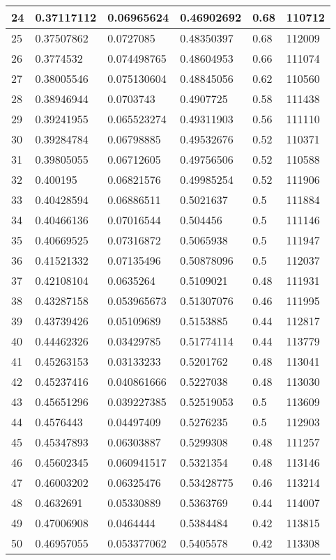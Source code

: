 \begin{longtable}{|l|l|l|l|l|l|}
24 & 0.37117112 & 0.06965624 & 0.46902692 & 0.68 & 110712 \\ \hline 
25 & 0.37507862 & 0.0727085 & 0.48350397 & 0.68 & 112009 \\ \hline 
26 & 0.3774532 & 0.074498765 & 0.48604953 & 0.66 & 111074 \\ \hline 
27 & 0.38005546 & 0.075130604 & 0.48845056 & 0.62 & 110560 \\ \hline 
28 & 0.38946944 & 0.0703743 & 0.4907725 & 0.58 & 111438 \\ \hline 
29 & 0.39241955 & 0.065523274 & 0.49311903 & 0.56 & 111110 \\ \hline 
30 & 0.39284784 & 0.06798885 & 0.49532676 & 0.52 & 110371 \\ \hline 
31 & 0.39805055 & 0.06712605 & 0.49756506 & 0.52 & 110588 \\ \hline 
32 & 0.400195 & 0.06821576 & 0.49985254 & 0.52 & 111906 \\ \hline 
33 & 0.40428594 & 0.06886511 & 0.5021637 & 0.5 & 111884 \\ \hline 
34 & 0.40466136 & 0.07016544 & 0.504456 & 0.5 & 111146 \\ \hline 
35 & 0.40669525 & 0.07316872 & 0.5065938 & 0.5 & 111947 \\ \hline 
36 & 0.41521332 & 0.07135496 & 0.50878096 & 0.5 & 112037 \\ \hline 
37 & 0.42108104 & 0.0635264 & 0.5109021 & 0.48 & 111931 \\ \hline 
38 & 0.43287158 & 0.053965673 & 0.51307076 & 0.46 & 111995 \\ \hline 
39 & 0.43739426 & 0.05109689 & 0.5153885 & 0.44 & 112817 \\ \hline 
40 & 0.44462326 & 0.03429785 & 0.51774114 & 0.44 & 113779 \\ \hline 
41 & 0.45263153 & 0.03133233 & 0.5201762 & 0.48 & 113041 \\ \hline 
42 & 0.45237416 & 0.040861666 & 0.5227038 & 0.48 & 113030 \\ \hline 
43 & 0.45651296 & 0.039227385 & 0.52519053 & 0.5 & 113609 \\ \hline 
44 & 0.4576443 & 0.04497409 & 0.5276235 & 0.5 & 112903 \\ \hline 
45 & 0.45347893 & 0.06303887 & 0.5299308 & 0.48 & 111257 \\ \hline 
46 & 0.45602345 & 0.060941517 & 0.5321354 & 0.48 & 113146 \\ \hline 
47 & 0.46003202 & 0.06325476 & 0.53428775 & 0.46 & 113214 \\ \hline 
48 & 0.4632691 & 0.05330889 & 0.5363769 & 0.44 & 114007 \\ \hline 
49 & 0.47006908 & 0.0464444 & 0.5384484 & 0.42 & 113815 \\ \hline 
50 & 0.46957055 & 0.053377062 & 0.5405578 & 0.42 & 113308 \\ \hline 
\end{longtable}